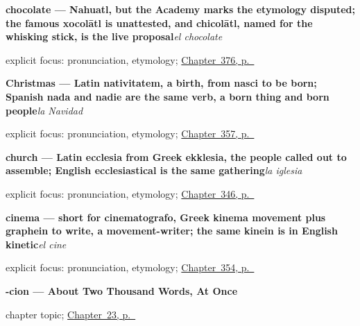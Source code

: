 \noindent\begin{minipage}[t]{\linewidth}
\raggedright
\textbf{chocolate — Nahuatl, but the Academy marks the etymology disputed; the famous xocolātl is unattested, and chicolātl, named for the whisking stick, is the live proposal}\enspace\emph{el chocolate}\par
\footnotesize explicit focus: pronunciation, etymology; \hyperref[ch:la-harina-y-la-uva]{Chapter~376, p.~\pageref*{ch:la-harina-y-la-uva}}
\end{minipage}\par\smallskip

\noindent\begin{minipage}[t]{\linewidth}
\raggedright
\textbf{Christmas — Latin nativitatem, a birth, from nasci to be born; Spanish nada and nadie are the same verb, a born thing and born people}\enspace\emph{la Navidad}\par
\footnotesize explicit focus: pronunciation, etymology; \hyperref[ch:la-navidad-y-la-pascua]{Chapter~357, p.~\pageref*{ch:la-navidad-y-la-pascua}}
\end{minipage}\par\smallskip

\noindent\begin{minipage}[t]{\linewidth}
\raggedright
\textbf{church — Latin ecclesia from Greek ekklesia, the people called out to assemble; English ecclesiastical is the same gathering}\enspace\emph{la iglesia}\par
\footnotesize explicit focus: pronunciation, etymology; \hyperref[ch:lugares-del-pueblo]{Chapter~346, p.~\pageref*{ch:lugares-del-pueblo}}
\end{minipage}\par\smallskip

\noindent\begin{minipage}[t]{\linewidth}
\raggedright
\textbf{cinema — short for cinematografo, Greek kinema movement plus graphein to write, a movement-writer; the same kinein is in English kinetic}\enspace\emph{el cine}\par
\footnotesize explicit focus: pronunciation, etymology; \hyperref[ch:el-hotel-y-el-cine]{Chapter~354, p.~\pageref*{ch:el-hotel-y-el-cine}}
\end{minipage}\par\smallskip

\noindent\begin{minipage}[t]{\linewidth}
\raggedright
\textbf{-cion --- About Two Thousand Words, At Once}\par
\footnotesize chapter topic; \hyperref[ch:friend-cion]{Chapter~23, p.~\pageref*{ch:friend-cion}}
\end{minipage}\par\smallskip

